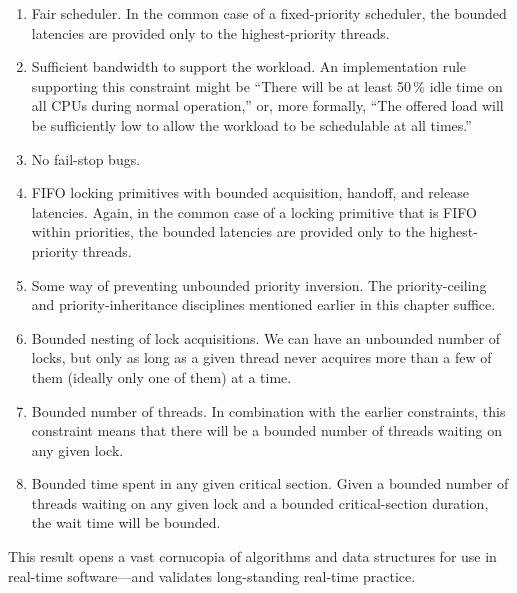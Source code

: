 \begin{enumerate}
\item	Fair scheduler.
	In the common case of a fixed-priority scheduler, the bounded
	latencies are provided only to the highest-priority threads.
\item	Sufficient bandwidth to support the workload.
	An implementation rule supporting this constraint might be
	``There will be at least 50\,\% idle time on all CPUs
	during normal operation,''
	or, more formally, ``The offered load will be sufficiently low
	to allow the workload to be schedulable at all times.''
\item	No fail-stop bugs.
\item	FIFO locking primitives with bounded acquisition, handoff,
	and release latencies.
	Again, in the common case of a locking primitive that is FIFO
	within priorities, the bounded latencies are provided only
	to the highest-priority threads.
\item	Some way of preventing unbounded priority inversion.
	The priority-ceiling and priority-inheritance disciplines
	mentioned earlier in this chapter suffice.
\item	Bounded nesting of lock acquisitions.
	We can have an unbounded number of locks, but only as long as a
	given thread never acquires more than a few of them (ideally only
	one of them) at a time.
\item	Bounded number of threads.
	In combination with the earlier constraints, this constraint means
	that there will be a bounded number of threads waiting on any
	given lock.
\item	Bounded time spent in any given critical section.
	Given a bounded number of threads waiting on any given lock and
	a bounded critical-section duration, the wait time will be bounded.
\end{enumerate}

\QuickQuizEnd

This result opens a vast cornucopia of algorithms and data structures
for use in real-time software---and validates long-standing real-time practice.

